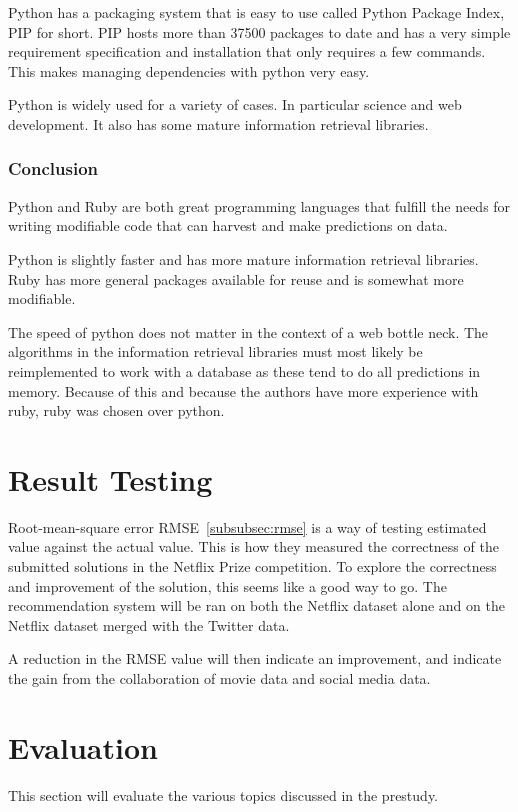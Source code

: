 Python has a packaging system that is easy to use called Python Package Index, PIP for short. PIP hosts more than 37500 packages to date and has a very simple requirement specification and installation that only requires a few commands. This makes managing dependencies with python very easy.\cite{pip}

Python is widely used for a variety of cases. In particular science and web development. It also has some mature information retrieval libraries.

\subsubsection{Conclusion}
Python and Ruby are both great programming languages that fulfill the needs for writing modifiable code that can harvest and make predictions on data.

Python is slightly faster and has more mature information retrieval libraries. Ruby has more general packages available for reuse and is somewhat more modifiable.

The speed of python does not matter in the context of a web bottle neck. The algorithms in the information retrieval libraries must most likely be reimplemented to work with a database as these tend to do all predictions in memory. Because of this and because the authors have more experience with ruby, ruby was chosen over python.


\section{Result Testing}
Root-mean-square error RMSE~\ref{subsubsec:rmse} is a way of testing estimated value against the actual value. This is how they measured the correctness of the submitted solutions in the Netflix Prize competition. To explore the correctness and improvement of the solution, this seems like a good way to go. The recommendation system will be ran on both the Netflix dataset alone and on the Netflix dataset merged with the Twitter data.

A reduction in the RMSE value will then indicate an improvement, and indicate the gain from the collaboration of movie data and social media data.

\section{Evaluation}\label{sec:prestrud-eval}
This section will evaluate the various topics discussed in the prestudy.

